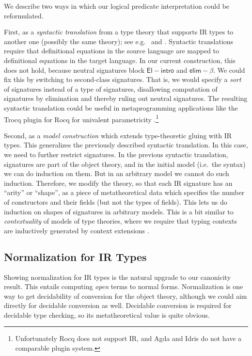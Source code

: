 \documentclass[acmsmall,screen,review]{acmart}
\newcommand{\msf}[1]{{\mathsf{#1}}}
\newcommand{\elim}{\msf{elim}}
\newcommand{\Elintro}{\msf{El\!\!-\!\!intro}}
\newcommand{\elimbeta}{\elim\!-\!\!\beta}
\begin{document}
We describe two ways in which our logical predicate interpretation could be reformulated.

First, as a \emph{syntactic translation} from a type theory that supports IR types to another one
(possibly the same theory); see e.g.\ \cite{next700} and \cite{bernardy12parametricity}. Syntactic
translations require that definitional equations in the source language are mapped to definitional
equations in the target language. In our current construction, this does not hold, because neutral
signatures block $\Elintro$ and $\elimbeta$. We could fix this by switching to second-class
signatures. That is, we would specify a \emph{sort} of signatures instead of a type of signatures,
disallowing computation of signatures by elimination and thereby ruling out neutral signatures. The
resulting syntactic translation could be useful in metaprogramming applications like the Trocq
plugin for Rocq for univalent parametricity \cite{cohen2024trocq}.\footnote{Unfortunately Rocq does
not support IR, and Agda and Idris do not have a comparable plugin system.}

Second, as a \emph{model construction} which extends type-theoretic gluing with IR types. This
generalizes the previously described syntactic translation. In this case, we need to further
restrict signatures. In the previous syntactic translation, signatures are part of the object
theory, and in the initial model (i.e.\ the syntax) we can do induction on them. But in an arbitrary
model we cannot do such induction. Therefore, we modify the theory, so that each IR signature has
an ``arity'' or ``shape'', as a piece of metatheoretical data which specifies the number of
constructors and their fields (but not the types of fields). This lets us do induction on shapes of
signatures in arbitrary models. This is a bit similar to \emph{contextuality} of models of type
theories, where we require that typing contexts are inductively generated by context extensions
\cite{gat,cwfs}.

\subsection{Normalization for IR Types}

Showing normalization for IR types is the natural upgrade to our canonicity result. This entails
computing \emph{open} terms to normal forms. Normalization is one way to get decidability of
conversion for the object theory, although we could aim directly for decidable conversion as well.
Decidable conversion is required for decidable type checking, so its metatheoretical value is quite
obvious.
\end{document}
